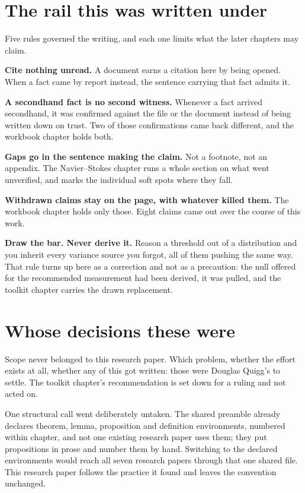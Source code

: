 \section{The rail this was written under}

Five rules governed the writing, and each one limits what the later chapters may claim.

\textbf{Cite nothing unread.} A document earns a citation here by being opened. When a fact came
by report instead, the sentence carrying that fact admits it.

\textbf{A secondhand fact is no second witness.} Whenever a fact arrived secondhand, it was
confirmed against the file or the document instead of being written down on trust. Two of those confirmations came back different, and the workbook chapter holds both.

\textbf{Gaps go in the sentence making the claim.} Not a footnote, not an appendix. The
Navier--Stokes chapter runs a whole section on what went unverified, and marks the individual soft
spots where they fall.

\textbf{Withdrawn claims stay on the page, with whatever killed them.} The workbook chapter holds
only those. Eight claims came out over the course of this work.

\textbf{Draw the bar. Never derive it.} Reason a threshold out of a distribution and you inherit
every variance source you forgot, all of them pushing the same way. That rule turns up here as a
correction and not as a precaution: the null offered for the recommended measurement had been
derived, it was pulled, and the toolkit chapter carries the drawn replacement.

\section{Whose decisions these were}

Scope never belonged to this research paper. Which problem, whether the effort exists at all, whether any of
this got written: those were Douglas Quigg's to settle. The toolkit chapter's recommendation is set down for a
ruling and not acted on.

One structural call went deliberately untaken. The shared preamble already declares theorem, lemma,
proposition and definition environments, numbered within chapter, and not one existing research paper uses
them; they put propositions in prose and number them by hand. Switching to the declared environments
would reach all seven research papers through that one shared file. This research paper follows the practice it found
and leaves the convention unchanged.
